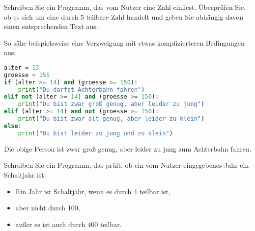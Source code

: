 \documentclass[11pt, a4paper, oneside]{article}
\begin{document}
	\pagebreak
	
	Schreiben Sie ein Programm, das vom Nutzer eine Zahl einliest.
	Überprüfen Sie, ob es sich um eine durch 5 teilbare Zahl handelt und geben Sie abhängig davon einen entsprechenden Text aus.
	
	
	So sähe beispielsweise eine Verzweigung mit etwas komplizierteren Bedingungen aus:
	
	\begin{lstlisting}[language=python]
alter = 13
groesse = 155
if (alter >= 14) and (groesse >= 150):
	print("Du darfst Achterbahn fahren")
elif not (alter >= 14) and (groesse >= 150):
	print("Du bist zwar groß genug, aber leider zu jung")
elif (alter >= 14) and not (groesse >= 150):
	print("Du bist zwar alt genug, aber leider zu klein")
else:
	print("Du bist leider zu jung und zu klein")
	\end{lstlisting}
	Die obige Person ist zwar groß genug, aber leider zu jung zum Achterbahn fahren.
	
	
	Schreiben Sie ein Programm, das prüft, ob ein vom Nutzer eingegebenes Jahr ein Schaltjahr ist:
	\begin{itemize}
		\item Ein Jahr ist Schaltjahr, wenn es durch 4 teilbar ist,
		\item aber nicht durch 100,
		\item außer es ist auch durch 400 teilbar.
	\end{itemize}
\end{document}
